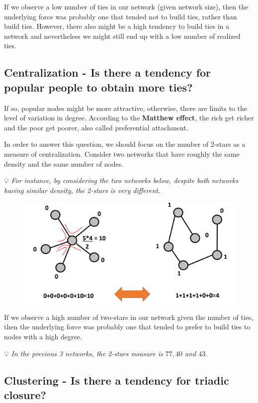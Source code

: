 \documentclass[
  notitlepage,
  onecolumn,
  openany]{book}
\begin{document}
If we observe a low number of ties in our network (given network size), then the underlying force was probably one that tended not to build ties, rather than build ties. However, there also might be a high tendency to build ties in a network and nevertheless we might still end up with a low number of realized ties.

\hypertarget{centralization---is-there-a-tendency-for-popular-people-to-obtain-more-ties}{%
\subsection{Centralization - Is there a tendency for popular people to obtain more ties?}\label{centralization---is-there-a-tendency-for-popular-people-to-obtain-more-ties}}

If so, popular nodes might be more attractive, otherwise, there are limits to the level of variation in degree. According to the \textbf{Matthew effect}, the rich get richer and the poor get poorer, also called preferential attachment.

In order to answer this question, we should focus on the number of 2-stars as a measure of centralization. Consider two networks that have roughly the same density and the same number of nodes.

💡 \emph{For instance, by considering the two networks below, despite both networks having similar density, the 2-stars is very different.}

\begin{figure}[h!]

{\centering \includegraphics[width=0.5\linewidth]{images/13-ERGMs/Untitled 1} 

}

\end{figure}

If we observe a high number of two-stars in our network given the number of ties, then the underlying force was probably one that tended to prefer to build ties to nodes with a high degree.

💡 \emph{In the previous 3 networks, the 2-stars measure is \(77, 40\) and \(43\).}

\hypertarget{clustering---is-there-a-tendency-for-triadic-closure}{%
\subsection{Clustering - Is there a tendency for triadic closure?}\label{clustering---is-there-a-tendency-for-triadic-closure}}
\end{document}
